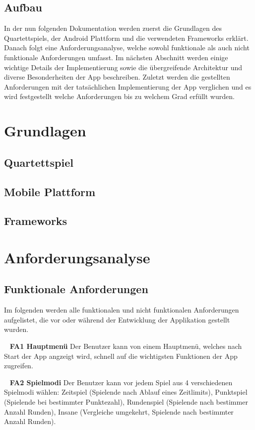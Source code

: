 \documentclass{scrartcl}
\begin{document}
\subsection{Aufbau}

In der nun folgenden Dokumentation werden zuerst die Grundlagen des
Quartettspiels, der Android Plattform und die verwendeten Frameworks erklärt.
Danach folgt eine Anforderungsanalyse, welche sowohl funktionale als auch nicht
funktionale Anforderungen umfasst. Im nächsten Abschnitt werden einige wichtige
Details der Implementierung sowie die übergreifende Architektur und diverse
Besonderheiten der App beschreiben. Zuletzt werden die gestellten Anforderungen
mit der tatsächlichen Implementierung der App verglichen und es wird
festgestellt welche Anforderungen bis zu welchem Grad erfüllt wurden.

\section{Grundlagen}
\subsection{Quartettspiel}
\subsection{Mobile Plattform}
\subsection{Frameworks}

\section{Anforderungsanalyse}
\subsection{Funktionale Anforderungen}

Im folgenden werden alle funktionalen und nicht funktionalen Anforderungen
aufgelistet, die vor oder während der Entwicklung der Applikation gestellt wurden.

\ \newline
\textbf{FA1 Hauptmenü} \newline
Der Benutzer kann von einem Hauptmenü, welches nach Start der App angzeigt wird,
schnell auf die wichtigsten Funktionen der App zugreifen.

\ \newline
\textbf{FA2 Spielmodi} \newline
Der Benutzer kann vor jedem Spiel aus 4 verschiedenen Spielmodi wählen: Zeitspiel
(Spielende nach Ablauf eines Zeitlimits), Punktspiel (Spielende bei bestimmter
Punktezahl), Rundenspiel (Spielende nach bestimmer Anzahl Runden), Insane
(Vergleiche umgekehrt, Spielende nach bestimmter Anzahl Runden).
\end{document}
